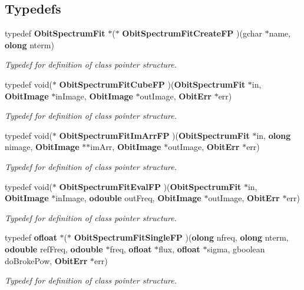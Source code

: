 \subsection*{Typedefs}
\begin{CompactItemize}
\item 
typedef {\bf Obit\-Spectrum\-Fit} $\ast$($\ast$ {\bf Obit\-Spectrum\-Fit\-Create\-FP} )(gchar $\ast$name, {\bf olong} nterm)
\begin{CompactList}\small\item\em Typedef for definition of class pointer structure. \item\end{CompactList}\item 
typedef void($\ast$ {\bf Obit\-Spectrum\-Fit\-Cube\-FP} )({\bf Obit\-Spectrum\-Fit} $\ast$in, {\bf Obit\-Image} $\ast$in\-Image, {\bf Obit\-Image} $\ast$out\-Image, {\bf Obit\-Err} $\ast$err)
\begin{CompactList}\small\item\em Typedef for definition of class pointer structure. \item\end{CompactList}\item 
typedef void($\ast$ {\bf Obit\-Spectrum\-Fit\-Im\-Arr\-FP} )({\bf Obit\-Spectrum\-Fit} $\ast$in, {\bf olong} nimage, {\bf Obit\-Image} $\ast$$\ast$im\-Arr, {\bf Obit\-Image} $\ast$out\-Image, {\bf Obit\-Err} $\ast$err)
\begin{CompactList}\small\item\em Typedef for definition of class pointer structure. \item\end{CompactList}\item 
typedef void($\ast$ {\bf Obit\-Spectrum\-Fit\-Eval\-FP} )({\bf Obit\-Spectrum\-Fit} $\ast$in, {\bf Obit\-Image} $\ast$in\-Image, {\bf odouble} out\-Freq, {\bf Obit\-Image} $\ast$out\-Image, {\bf Obit\-Err} $\ast$err)
\begin{CompactList}\small\item\em Typedef for definition of class pointer structure. \item\end{CompactList}\item 
typedef {\bf ofloat} $\ast$($\ast$ {\bf Obit\-Spectrum\-Fit\-Single\-FP} )({\bf olong} nfreq, {\bf olong} nterm, {\bf odouble} ref\-Freq, {\bf odouble} $\ast$freq, {\bf ofloat} $\ast$flux, {\bf ofloat} $\ast$sigma, gboolean do\-Broke\-Pow, {\bf Obit\-Err} $\ast$err)
\begin{CompactList}\small\item\em Typedef for definition of class pointer structure. \item\end{CompactList}\end{CompactItemize}
